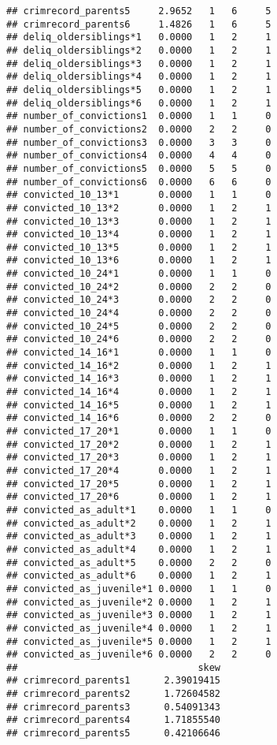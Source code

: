 \documentclass[]{tufte-handout}
\begin{document}
\begin{verbatim}
## crimrecord_parents5     2.9652   1   6     5
## crimrecord_parents6     1.4826   1   6     5
## deliq_oldersiblings*1   0.0000   1   2     1
## deliq_oldersiblings*2   0.0000   1   2     1
## deliq_oldersiblings*3   0.0000   1   2     1
## deliq_oldersiblings*4   0.0000   1   2     1
## deliq_oldersiblings*5   0.0000   1   2     1
## deliq_oldersiblings*6   0.0000   1   2     1
## number_of_convictions1  0.0000   1   1     0
## number_of_convictions2  0.0000   2   2     0
## number_of_convictions3  0.0000   3   3     0
## number_of_convictions4  0.0000   4   4     0
## number_of_convictions5  0.0000   5   5     0
## number_of_convictions6  0.0000   6   6     0
## convicted_10_13*1       0.0000   1   1     0
## convicted_10_13*2       0.0000   1   2     1
## convicted_10_13*3       0.0000   1   2     1
## convicted_10_13*4       0.0000   1   2     1
## convicted_10_13*5       0.0000   1   2     1
## convicted_10_13*6       0.0000   1   2     1
## convicted_10_24*1       0.0000   1   1     0
## convicted_10_24*2       0.0000   2   2     0
## convicted_10_24*3       0.0000   2   2     0
## convicted_10_24*4       0.0000   2   2     0
## convicted_10_24*5       0.0000   2   2     0
## convicted_10_24*6       0.0000   2   2     0
## convicted_14_16*1       0.0000   1   1     0
## convicted_14_16*2       0.0000   1   2     1
## convicted_14_16*3       0.0000   1   2     1
## convicted_14_16*4       0.0000   1   2     1
## convicted_14_16*5       0.0000   1   2     1
## convicted_14_16*6       0.0000   2   2     0
## convicted_17_20*1       0.0000   1   1     0
## convicted_17_20*2       0.0000   1   2     1
## convicted_17_20*3       0.0000   1   2     1
## convicted_17_20*4       0.0000   1   2     1
## convicted_17_20*5       0.0000   1   2     1
## convicted_17_20*6       0.0000   1   2     1
## convicted_as_adult*1    0.0000   1   1     0
## convicted_as_adult*2    0.0000   1   2     1
## convicted_as_adult*3    0.0000   1   2     1
## convicted_as_adult*4    0.0000   1   2     1
## convicted_as_adult*5    0.0000   2   2     0
## convicted_as_adult*6    0.0000   1   2     1
## convicted_as_juvenile*1 0.0000   1   1     0
## convicted_as_juvenile*2 0.0000   1   2     1
## convicted_as_juvenile*3 0.0000   1   2     1
## convicted_as_juvenile*4 0.0000   1   2     1
## convicted_as_juvenile*5 0.0000   1   2     1
## convicted_as_juvenile*6 0.0000   2   2     0
##                                skew
## crimrecord_parents1      2.39019415
## crimrecord_parents2      1.72604582
## crimrecord_parents3      0.54091343
## crimrecord_parents4      1.71855540
## crimrecord_parents5      0.42106646

\end{verbatim}
\end{document}
